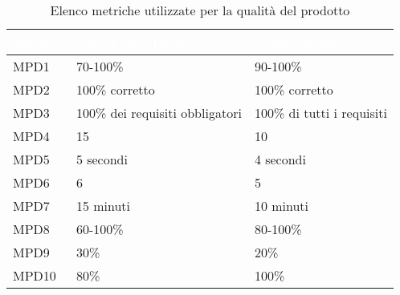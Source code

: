 \renewcommand{\arraystretch}{1.5}
\begin{longtable}{C{2.5cm} C{4cm} C{4cm}}
\textcolor{white}{\textbf{Metrica}}&
\textcolor{white}{\textbf{Valori accettabile}}&
\textcolor{white}{\textbf{Valore ottimale}}\\	
\endhead
\endfoot
{}\caption{Elenco metriche utilizzate per la qualità del prodotto}
\endlastfoot
		MPD1 &  
		70-100\% & 
		90-100\% \\
		MPD2 & 
		100\% corretto & 
		100\% corretto \\
		MPD3 & 
		100\% dei requisiti obbligatori &
		100\% di tutti i requisiti \\
		MPD4 &  
		15 &
		10 \\
		MPD5 &  
		5 secondi &
		4 secondi \\
		MPD6 &  
		6 &
		5 \\
		MPD7 &  
		15 minuti &
		10 minuti\\
		MPD8 &  
		60-100\% &
		80-100\% \\
		MPD9 &  
		30\% &
		20\% \\
		MPD10 &  
		80\% &
		100\% \\
\end{longtable}